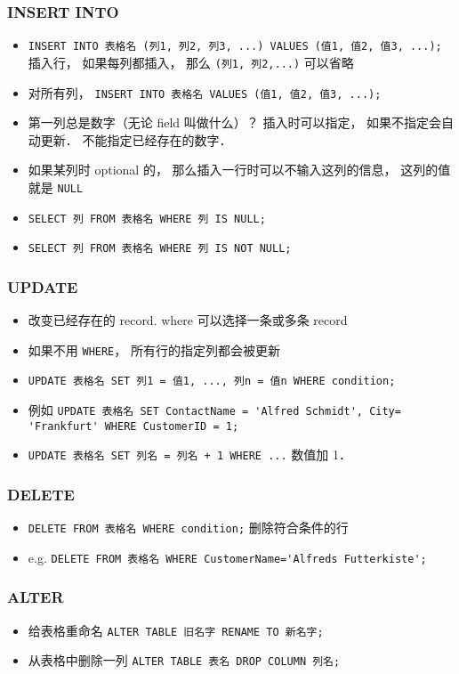 \subsubsection{INSERT INTO}
\begin{itemize}
\item \verb`INSERT INTO 表格名 (列1, 列2, 列3, ...) VALUES (值1, 值2, 值3, ...);` 插入行， 如果每列都插入， 那么 \verb`(列1, 列2,...)` 可以省略
\item 对所有列， \verb`INSERT INTO 表格名 VALUES (值1, 值2, 值3, ...);`
\item 第一列总是数字（无论 field 叫做什么）？ 插入时可以指定，  如果不指定会自动更新． 不能指定已经存在的数字．
\item 如果某列时 optional 的， 那么插入一行时可以不输入这列的信息， 这列的值就是 \verb`NULL`
\item \verb`SELECT 列 FROM 表格名 WHERE 列 IS NULL;`
\item \verb`SELECT 列 FROM 表格名 WHERE 列 IS NOT NULL;`
\end{itemize}

\subsubsection{UPDATE}
\begin{itemize}
\item 改变已经存在的 record. where 可以选择一条或多条 record
\item 如果不用 \verb`WHERE`， 所有行的指定列都会被更新
\item \verb`UPDATE 表格名 SET 列1 = 值1, ..., 列n = 值n WHERE condition;`
\item 例如 \verb`UPDATE 表格名 SET ContactName = 'Alfred Schmidt', City= 'Frankfurt' WHERE CustomerID = 1;`
\item \verb|UPDATE 表格名 SET 列名 = 列名 + 1 WHERE ...| 数值加 1．
\end{itemize}

\subsubsection{DELETE}
\begin{itemize}
\item \verb`DELETE FROM 表格名 WHERE condition;` 删除符合条件的行
\item e.g. \verb`DELETE FROM 表格名 WHERE CustomerName='Alfreds Futterkiste';`
\end{itemize}

\subsubsection{ALTER}
\begin{itemize}
\item 给表格重命名 \verb|ALTER TABLE 旧名字 RENAME TO 新名字;|
\item 从表格中删除一列 \verb|ALTER TABLE 表名 DROP COLUMN 列名;|
\end{itemize}

